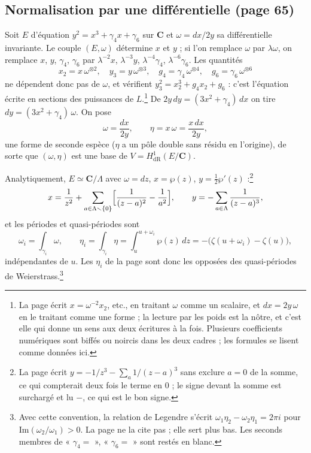 \documentclass[11pt,a4paper]{article}
\begin{document}
\subsection*{Normalisation par une différentielle (page 65)}

Soit $E$ d'équation $y^2 = x^3 + \gamma_4 x + \gamma_6$ sur $\mathbf{C}$ et
$\omega = dx/2y$ sa différentielle invariante. Le couple $(E,\omega)$
détermine $x$ et $y$ ; si l'on remplace $\omega$ par $\lambda\omega$, on
remplace $x$, $y$, $\gamma_4$, $\gamma_6$ par $\lambda^{-2}x$, $\lambda^{-3}y$,
$\lambda^{-4}\gamma_4$, $\lambda^{-6}\gamma_6$. Les quantités
\[
x_2 = x\,\omega^{\otimes 2},\quad y_3 = y\,\omega^{\otimes 3},\quad
g_4 = \gamma_4\,\omega^{\otimes 4},\quad g_6 = \gamma_6\,\omega^{\otimes 6}
\]
ne dépendent donc pas de $\omega$, et vérifient $y_3^2 = x_2^3 + g_4x_2 +
g_6$ : c'est l'équation écrite en sections des puissances de
$L$.\footnote{La page écrit $x = \omega^{-2}x_2$, etc., en traitant $\omega$
comme un scalaire, et $dx = 2y\,\omega$ en le traitant comme une forme ; la
lecture par les poids est la nôtre, et c'est elle qui donne un sens aux deux
écritures à la fois. Plusieurs coefficients numériques sont biffés ou noircis
dans les deux cadres ; les formules se lisent comme données ici.} De $2y\,dy =
(3x^2+\gamma_4)\,dx$ on tire $dy = (3x^2+\gamma_4)\,\omega$. On pose
\[
\omega = \frac{dx}{2y}, \qquad \eta = x\,\omega = \frac{x\,dx}{2y},
\]
une forme de seconde espèce ($\eta$ a un pôle double sans résidu en
l'origine), de sorte que $(\omega,\eta)$ est une base de $V =
H^1_{\mathrm{dR}}(E/\mathbf{C})$.

Analytiquement, $E \simeq \mathbf{C}/\Lambda$ avec $\omega = dz$, $x =
\wp(z)$, $y = \tfrac12\wp'(z)$ :\footnote{La page écrit $y = -1/z^3 - \sum_{a} 1/(z-a)^3$ sans exclure $a=0$
de la somme, ce qui compterait deux fois le terme en $0$ ; le signe devant la
somme est surchargé et lu $-$, ce qui est le bon signe.}
\[
x = \frac{1}{z^2} + \sum_{a\in\Lambda\smallsetminus\{0\}}
\Bigl[\frac{1}{(z-a)^2} - \frac{1}{a^2}\Bigr], \qquad
y = -\sum_{a\in\Lambda}\frac{1}{(z-a)^3},
\]
et les périodes et quasi-périodes sont
\[
\omega_i = \int_{\gamma_i}\omega, \qquad
\eta_i = \int_{\gamma_i}\eta = \int_u^{u+\omega_i}\wp(z)\,dz
= -\bigl(\zeta(u+\omega_i) - \zeta(u)\bigr),
\]
indépendantes de $u$. Les $\eta_i$ de la page sont donc les opposées des
quasi-périodes de Weierstrass.\footnote{Avec cette convention, la relation de
Legendre s'écrit $\omega_1\eta_2 - \omega_2\eta_1 = 2\pi i$ pour
$\mathrm{Im}(\omega_2/\omega_1) > 0$. La page ne la cite pas ; elle sert
plus bas. Les seconds membres de « $\gamma_4 = $ », « $\gamma_6 = $ » sont
restés en blanc.}
\end{document}
